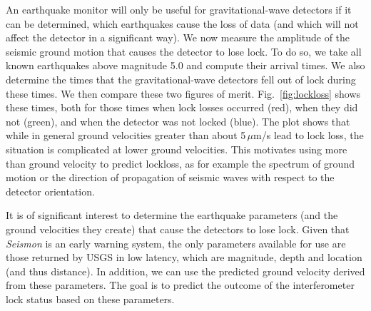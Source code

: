\documentclass[reprint, prl, aps, showpacs]{revtex4-1}
\begin{document}
An earthquake monitor will only be useful for gravitational-wave detectors if it can be determined, which earthquakes cause the loss of data (and which will not affect the detector in a significant way).
We now measure the amplitude of the seismic ground motion that causes the detector to lose lock. To do so, we take all known earthquakes above magnitude 5.0 and compute their arrival times. 
We also determine the times that the gravitational-wave detectors fell out of lock during these times. 
We then compare these two figures of merit. 
Fig.~\ref{fig:lockloss} shows these times, both for those times when lock losses occurred (red), when they did not (green), and when the detector was not locked (blue). 
The plot shows that while in general ground velocities greater than about 5\,$\mu$m/s lead to lock loss, the situation is complicated at lower ground velocities. This motivates using more than ground velocity to predict lockloss, as for example the spectrum of ground motion or the direction of propagation of seismic waves with respect to the detector orientation.


It is of significant interest to determine the earthquake parameters (and the ground velocities they create) that cause the detectors to lose lock.
Given that \emph{Seismon} is an early warning system, the only parameters available for use are those returned by USGS in low latency, which are magnitude, depth and location (and thus distance). 
In addition, we can use the predicted ground velocity derived from these parameters.
The goal is to predict the outcome of the interferometer lock status based on these parameters.
\end{document}

